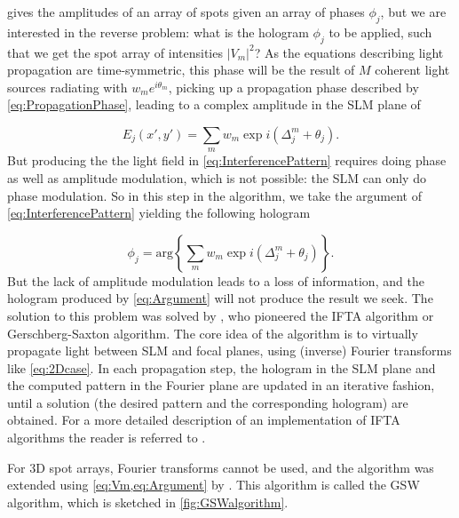  gives the amplitudes of an array of spots given an array of phases $\phi_j$, but we are interested in the reverse problem: what is the hologram $\phi_j$ to be applied, such that we get the spot array of intensities $|V_m|^2$? 
As the equations describing light propagation are time-symmetric, this phase will be the result of $M$ coherent light sources radiating with $w_m e^{i \theta_m}$, picking up a propagation phase described by \cref{eq:PropagationPhase}, leading to a complex amplitude in the \ac{SLM} plane of \cite{DiLeonardo2007,Leseleuc2018}

\begin{equation}\label{eq:InterferencePattern}
    E_j (x',y') = \sum_m w_m \exp{
    i\left(\Delta_j^m + \theta_j\right)
    }.
\end{equation}
But producing the the light field in \cref{eq:InterferencePattern} requires doing phase as well as amplitude modulation, which is not possible: the SLM can only do phase modulation.
So in this step in the algorithm, we take the argument of  \cref{eq:InterferencePattern} yielding the following hologram

\begin{equation}\label{eq:Argument}
    \phi_j = \text{arg}\left\{
     \sum_m w_m \exp{
    i\left(\Delta_j^m + \theta_j\right)
    }
    \right\}.
\end{equation}
But the lack of amplitude modulation leads to a loss of information, and the hologram produced by \cref{eq:Argument} will not produce the result we seek.
The solution to this problem was solved by \cite{Gerschberg1972}, who pioneered the \ac{IFTA} algorithm or Gerschberg-Saxton algorithm.
The core idea of the algorithm is to virtually propagate light between SLM and focal planes, using (inverse) Fourier transforms like \cref{eq:2Dcase}.
In each propagation step, the hologram in the SLM plane and the computed pattern in the Fourier plane are updated in an iterative fashion, until a solution (the desired pattern and the corresponding hologram) are obtained.
For a more detailed description of an implementation of IFTA algorithms the reader is referred to \cite{Bijnen2013,Bijnen2015}.

For 3D spot arrays, Fourier transforms cannot be used, and the algorithm was extended using \cref{eq:Vm,eq:Argument} by \cite{DiLeonardo2007}. 
This algorithm is called the \ac{GSW} algorithm, which is sketched in \cref{fig:GSWalgorithm}.

